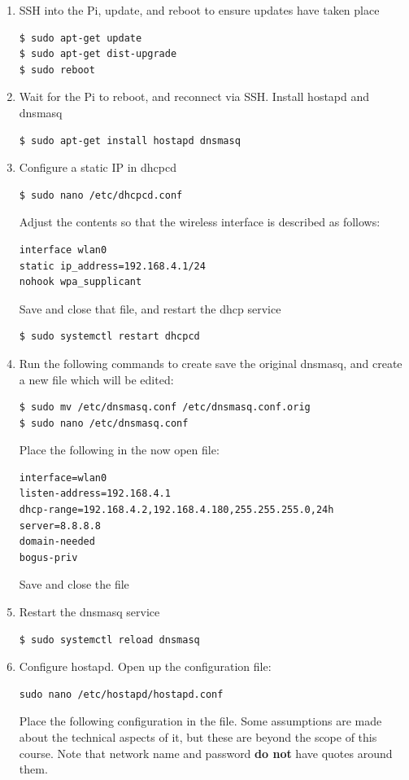 \begin{enumerate}
\item SSH into the Pi, update, and reboot to ensure updates have taken place
\begin{lstlisting}
$ sudo apt-get update
$ sudo apt-get dist-upgrade
$ sudo reboot
\end{lstlisting}
\item Wait for the Pi to reboot, and reconnect via SSH. Install hostapd and dnsmasq
\begin{lstlisting}
$ sudo apt-get install hostapd dnsmasq
\end{lstlisting}
\item Configure a static IP in dhcpcd
\begin{lstlisting}
$ sudo nano /etc/dhcpcd.conf
\end{lstlisting}
Adjust the contents so that the wireless interface is described as follows:
\begin{lstlisting}    
interface wlan0
static ip_address=192.168.4.1/24
nohook wpa_supplicant
\end{lstlisting}
Save and close that file, and restart the dhcp service
\begin{lstlisting}
$ sudo systemctl restart dhcpcd
\end{lstlisting}
\item Run the following commands to create save the original dnsmasq, and create a new file which will be edited:
\begin{lstlisting}
$ sudo mv /etc/dnsmasq.conf /etc/dnsmasq.conf.orig
$ sudo nano /etc/dnsmasq.conf
\end{lstlisting}
Place the following in the now open file:
\begin{lstlisting}
interface=wlan0
listen-address=192.168.4.1
dhcp-range=192.168.4.2,192.168.4.180,255.255.255.0,24h
server=8.8.8.8
domain-needed
bogus-priv
\end{lstlisting}
Save and close the file
\item Restart the dnsmasq service
\begin{lstlisting}
$ sudo systemctl reload dnsmasq
\end{lstlisting}
\item Configure hostapd. Open up the configuration file:
\begin{lstlisting}
sudo nano /etc/hostapd/hostapd.conf
\end{lstlisting}
Place the following configuration in the file. Some assumptions are made about the technical aspects of it, but these are beyond the scope of this course. Note that network name and password \textbf{do not} have quotes around them.

\end{enumerate}
